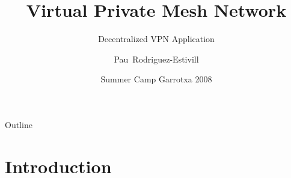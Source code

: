 \documentclass{beamer}
\title[VPMN]{Virtual Private Mesh Network} %
\subtitle{Decentralized VPN Application} %
\author[Pau]{Pau~Rodriguez-Estivill}
\date[SCG08] %
{Summer Camp Garrotxa 2008}
\begin{document}
\begin{frame}
  \titlepage
\end{frame}

\begin{frame}{Outline}
  \tableofcontents
\end{frame}



\section{Introduction}
\end{document}
